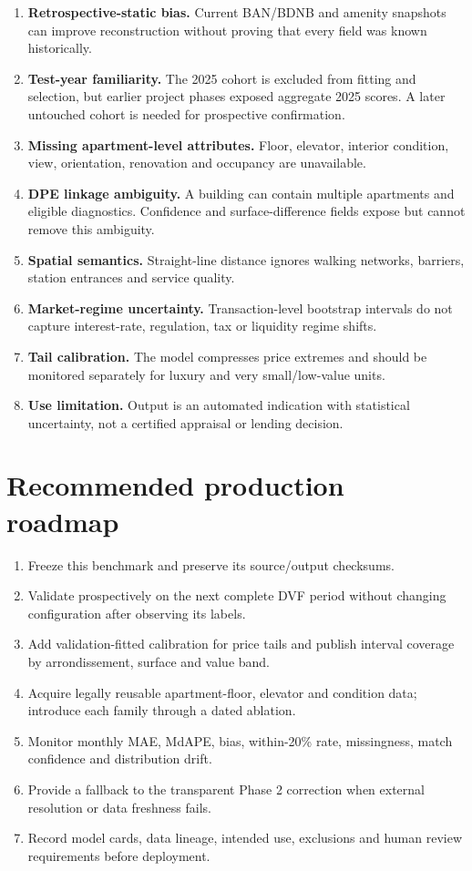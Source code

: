 \documentclass[11pt,a4paper]{article}
\begin{document}
\begin{enumerate}[leftmargin=1.8em]
  \item \textbf{Retrospective-static bias.} Current BAN/BDNB and amenity
  snapshots can improve reconstruction without proving that every field was
  known historically.
  \item \textbf{Test-year familiarity.} The 2025 cohort is excluded from
  fitting and selection, but earlier project phases exposed aggregate 2025
  scores. A later untouched cohort is needed for prospective confirmation.
  \item \textbf{Missing apartment-level attributes.} Floor, elevator, interior
  condition, view, orientation, renovation and occupancy are unavailable.
  \item \textbf{DPE linkage ambiguity.} A building can contain multiple
  apartments and eligible diagnostics. Confidence and surface-difference
  fields expose but cannot remove this ambiguity.
  \item \textbf{Spatial semantics.} Straight-line distance ignores walking
  networks, barriers, station entrances and service quality.
  \item \textbf{Market-regime uncertainty.} Transaction-level bootstrap
  intervals do not capture interest-rate, regulation, tax or liquidity regime
  shifts.
  \item \textbf{Tail calibration.} The model compresses price extremes and
  should be monitored separately for luxury and very small/low-value units.
  \item \textbf{Use limitation.} Output is an automated indication with
  statistical uncertainty, not a certified appraisal or lending decision.
\end{enumerate}

\section{Recommended production roadmap}

\begin{enumerate}[leftmargin=1.8em]
  \item Freeze this benchmark and preserve its source/output checksums.
  \item Validate prospectively on the next complete DVF period without
  changing configuration after observing its labels.
  \item Add validation-fitted calibration for price tails and publish interval
  coverage by arrondissement, surface and value band.
  \item Acquire legally reusable apartment-floor, elevator and condition data;
  introduce each family through a dated ablation.
  \item Monitor monthly MAE, MdAPE, bias, within-20\% rate, missingness, match
  confidence and distribution drift.
  \item Provide a fallback to the transparent Phase 2 correction when external
  resolution or data freshness fails.
  \item Record model cards, data lineage, intended use, exclusions and human
  review requirements before deployment.
\end{enumerate}
\end{document}
